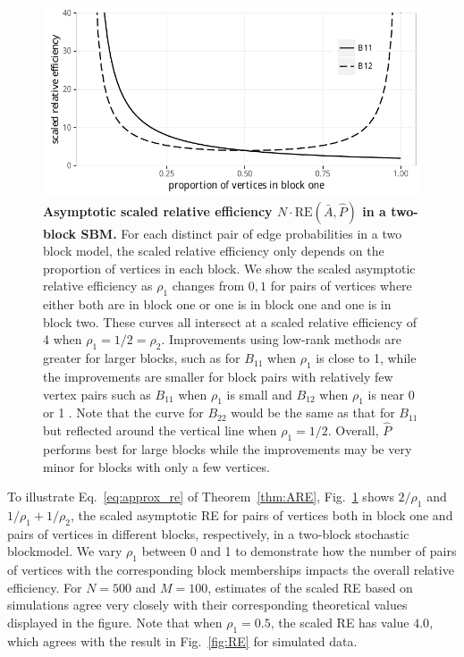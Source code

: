 \documentclass[10pt,letterpaper]{article}
\renewcommand{\hat}{\widehat}
\begin{document}
\begin{figure}[!t]
\centering
\includegraphics[width=1\textwidth]{Rho.pdf}
\caption{{\bf Asymptotic scaled relative efficiency $N\cdot \mathrm{RE}(\bar{A},\hat{P})$ in a two-block SBM.}
For each distinct pair of edge probabilities in a two block model, the scaled relative efficiency only depends on the proportion of vertices in each block.
We show the scaled asymptotic relative efficiency as $\rho_1$ changes from $0,1$ for pairs of vertices where either both are in block one or one is in block one and one is in block two. 
These curves all intersect at a scaled relative efficiency of 4 when $\rho_1=1/2=\rho_2$.
Improvements using low-rank methods are greater for larger blocks, such as for $B_{11}$ when $\rho_1$ is close to 1, while the improvements are smaller for block pairs with relatively few vertex pairs such as $B_{11}$ when $\rho_1$ is small and $B_{12}$ when $\rho_1$ is near 0 or 1
.
Note that the curve for $B_{22}$ would be the same as that for $B_{11}$ but reflected around the vertical line when $\rho_1=1/2$.
Overall, $\hat{P}$ performs best for large blocks while the improvements may be very minor for blocks with only a few vertices.
}
\label{fig:RErho}
\end{figure}



To illustrate Eq.~\ref{eq:approx_re} of Theorem~\ref{thm:ARE}, Fig.~\ref{fig:RErho} shows $2/\rho_1$ and $1/\rho_1+1/\rho_2$, the scaled asymptotic RE for pairs of vertices both in block one and pairs of vertices in different blocks, respectively, in a  two-block stochastic blockmodel.
We vary $\rho_1$ between 0 and 1 to demonstrate how the number of pairs of vertices with the corresponding block memberships impacts the overall relative efficiency.
For $N=500$ and $M=100$, estimates of the scaled RE based on simulations agree very closely with their corresponding theoretical values displayed in the figure. Note that when $\rho_1 = 0.5$, the scaled RE has value $4.0$, which agrees with the result in Fig.~\ref{fig:RE} for simulated data.
\end{document}
